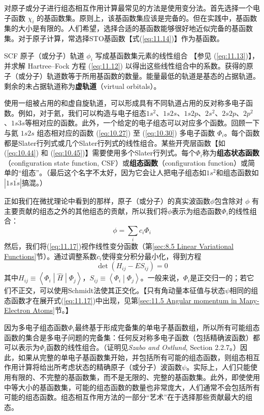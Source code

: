     对原子或分子进行组态相互作用计算最常见的方法是使用变分法。首先选择一个电子函数 $\chi_i$ 的基函数集。原则上，该基函数集应该是完备的。但在实践中，基函数集的大小是有限的。人们希望，选择合适的基函数能够很好地近似完备的基函数集。对于原子计算，常选择STO基函数【式(\ref{eq:11.14})】作为基函数。

    SCF 原子（或分子）轨道 $\phi_i$ 写成基函数集元素的线性组合 【参见 (\ref{eq:11.13})】，并求解 Hartree–Fock 方程 (\ref{eq:11.12}) 以得出这些线性组合中的系数。获得的原子（或分子）轨道数等于所用基函数的数量。能量最低的轨道是基态的占据轨道。剩余的未占据轨道称为\textbf{虚轨道}（virtual orbitals）。

    使用一组被占用的和虚自旋轨道，可以形成具有不同轨道占用的反对称多电子函数。例如，对于氦，我们可以构造与电子组态$1s^2$、$1s2s$、$1s2p$、$2s^2$、$2s2p$、$2p^2$、$1s3s$等相对应的函数。此外，一个给定的电子组态可以对应多个函数。回顾一下与氦 $1s2s$ 组态相对应的函数 (\ref{eq:10.27}) 至 (\ref{eq:10.30}) 多电子函数 $\Phi_i$。每个函数都是Slater行列式或几个Slater行列式的线性组合。某些开壳层函数【如 (\ref{eq:10.44}) 和 (\ref{eq:10.45})】需要使用多个Slater行列式。每个$\Phi_i$称为\textbf{组态状态函数}（configuration state function, CSF）或\textbf{组态函数}（configuration function）或简单的“组态”。（最后这个名字不太好，因为它会让人把电子组态如$1s^2$和组态函数如$\left|1s\overline{1s}\right|$搞混。）

    正如我们在微扰理论中看到的那样，原子（或分子）的真实波函数$\phi$包含除对 $\phi$ 有主要贡献的组态之外的其他组态的贡献，所以我们将$\phi$表示为组态函数$\Phi_i$的线性组合：
    \begin{equation}
        \phi = \sum_i c_i \Phi_i
        \label{eq:11.17}
    \end{equation}
    然后，我们将(\ref{eq:11.17})视作线性变分函数（第\ref{sec:8.5 Linear Variational Functions}节）。通过调整系数$c_i$使得变分积分最小化，得到方程
    \begin{equation}
        \det\left(H_{ij} - ES_{ij}\right) = 0
        \label{eq:11.18}
    \end{equation}
    其中$H_{ij} \equiv \left\langle \Phi_i \middle| \hat{H} \middle| \Phi_j \right\rangle$，$S_{ij} \equiv \left\langle \Phi_i \middle| \Phi_j \right\rangle$。一般来说，$\Phi_i$是正交归一的；若它们不正交，可以使用Schmidt法使其正交化。【只有角动量本征值与状态$\psi$相同的组态函数才在展开式(\ref{eq:11.17})中出现，见第\ref{sec:11.5 Angular momentum in Many-Electron Atoms}节。】

    因为多电子组态函数$\Phi_i$最终基于形成完备集的单电子基函数组，所以所有可能组态函数的集合是多电子问题的完备集：任何反对称多电子函数（包括精确波函数）都可以表示为$\Phi_i$函数的线性组合。（证明见\textit{Szabo and Ostlund}, Section 2.2.7。）因此，如果从完整的单电子基函数集开始，并包括所有可能的组态函数，则组态相互作用计算将给出所考虑状态的精确原子（或分子）波函数$\psi$。实际上，人们只能使用有限的、不完整的基函数集，而不是无限的、完整的基函数集。此外，即使使用中等大小的基函数集，可能的组态函数的数量也非常庞大，人们通常不会包括所有可能的组态函数。组态相互作用方法的一部分“艺术”在于选择那些贡献最大的组态。

